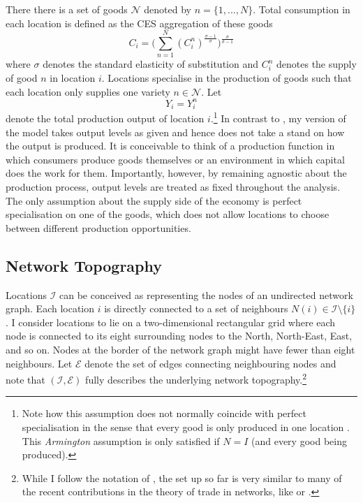 \documentclass[11pt, oneside]{article}   	%
\begin{document}
There there is a set of goods $\mathcal{N}$ denoted by $n =\{ 1,...,N\}$. Total consumption in each location is defined as the CES aggregation of these goods
\begin{equation*}
  C_{i} = \bigg( \sum_{n=1}^{N} (C_{i}^{n})^{\frac{\sigma-1}{\sigma}}\bigg)^{\frac{\sigma}{\sigma-1}}
\end{equation*}
where $\sigma$ denotes the standard elasticity of substitution and $C_{i}^{n}$ denotes the supply of good $n$ in location $i$. Locations specialise in the production of goods such that each location only supplies one variety $n \in \mathcal{N}$. Let
\begin{equation*}
  Y_{i} = Y_{i}^{n}
\end{equation*}
denote the total production output of location $i$.\footnote{Note how this assumption does not normally coincide with perfect specialisation in the sense that every good is only produced in one location \citep[as in e.g.][]{Anderson_Gravitygravitassolution_2003}. This \emph{Armington} assumption is only satisfied if $N=I$ (and every good being produced).} In contrast to \citeauthor{fajgelbaum_optimal_2017}, my version of the model takes output levels as given and hence does not take a stand on how the output is produced. It is conceivable to think of a production function in which consumers produce goods themselves or an environment in which capital does the work for them. Importantly, however, by remaining agnostic about the production process, output levels are treated as fixed throughout the analysis. The only assumption about the supply side of the economy is perfect specialisation on one of the goods, which does not allow locations to choose between different production opportunities.

\subsection{Network Topography}
Locations $\mathcal{I}$ can be conceived as representing the nodes of an undirected network graph. Each location $i$ is directly connected to a set of neighbours $N(i) \in \mathcal{I} \setminus \{ i\}$. I consider locations to lie on a two-dimensional rectangular grid where each node is connected to its eight surrounding nodes to the North, North-East, East, and so on. Nodes at the border of the network graph might have fewer than eight neighbours. Let $\mathcal{E}$ denote the set of edges connecting neighbouring nodes and note that $(\mathcal{I}, \mathcal{E})$ fully describes the underlying network topography.\footnote{While I follow the notation of \cite{fajgelbaum_optimal_2017}, the set up so far is very similar to many of the recent contributions in the theory of trade in networks, like \cite{allen_welfare_2016} or \cite{Galichon_OptimalTransportMethods_2016}.}
\end{document}
